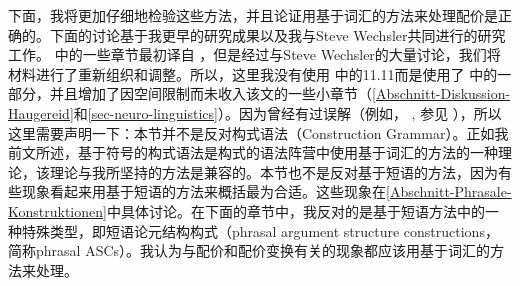 下面，我将更加仔细地检验这些方法，并且论证用基于词汇的方法来处理配价是正确的。下面的讨论基于我更早的研究成果\citep{Mueller2006d,Mueller2007d,MuellerPersian}以及我与Steve Wechsler共同进行的研究工作\citep{MWArgSt,MWArgStReply}。 \citet{MWArgSt}中的一些章节最初译自 \citet{MuellerGTBuch2}，但是经过与Steve Wechsler的大量讨论，我们将材料进行了重新组织和调整。所以，这里我没有使用 中的11.11而是使用了 中的一部分，并且增加了因空间限制而未收入该文的一些小章节（\ref{Abschnitt-Diskussion-Haugereid}和\ref{sec-neuro-linguistics}）。因为曾经有过误解（例如， , 参见  ），所以这里需要声明一下：本节并不是反对构式语法\indexcxg（Construction Grammar）。正如我前文所述，基于符号的构式语法是构式的语法阵营中使用基于词汇的方法的一种理论，该理论与我所坚持的方法是兼容的。本节也不是反对基于短语的方法，因为有些现象看起来用基于短语的方法来概括最为合适。这些现象在\ref{Abschnitt-Phrasale-Konstruktionen}中具体讨论。在下面的章节中，我反对的是基于短语方法中的一种特殊类型，即短语论元结构构式（phrasal argument structure constructions，简称phrasal ASCs）。我认为与配价和配价变换有关的现象都应该用基于词汇的方法来处理。
